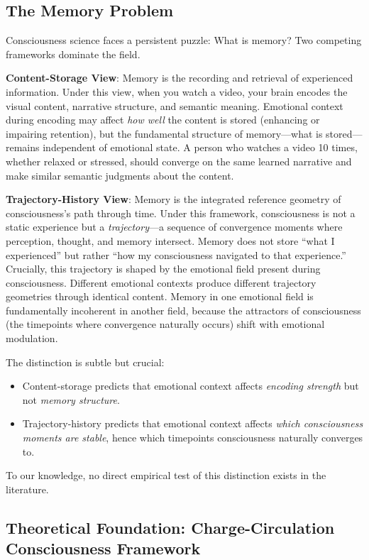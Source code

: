 \documentclass[12pt,a4paper]{article}
\theoremstyle{definition}
\begin{document}
\subsection{The Memory Problem}

Consciousness science faces a persistent puzzle: What is memory? Two competing frameworks dominate the field.

\textbf{Content-Storage View}: Memory is the recording and retrieval of experienced information. Under this view, when you watch a video, your brain encodes the visual content, narrative structure, and semantic meaning. Emotional context during encoding may affect \textit{how well} the content is stored (enhancing or impairing retention), but the fundamental structure of memory---what is stored---remains independent of emotional state. A person who watches a video 10 times, whether relaxed or stressed, should converge on the same learned narrative and make similar semantic judgments about the content.

\textbf{Trajectory-History View}: Memory is the integrated reference geometry of consciousness's path through time. Under this framework, consciousness is not a static experience but a \textit{trajectory}---a sequence of convergence moments where perception, thought, and memory intersect. Memory does not store ``what I experienced'' but rather ``how my consciousness navigated to that experience.'' Crucially, this trajectory is shaped by the emotional field present during consciousness. Different emotional contexts produce different trajectory geometries through identical content. Memory in one emotional field is fundamentally incoherent in another field, because the attractors of consciousness (the timepoints where convergence naturally occurs) shift with emotional modulation.

The distinction is subtle but crucial:
\begin{itemize}
  \item Content-storage predicts that emotional context affects \textit{encoding strength} but not \textit{memory structure}.
  \item Trajectory-history predicts that emotional context affects \textit{which consciousness moments are stable}, hence which timepoints consciousness naturally converges to.
\end{itemize}

To our knowledge, no direct empirical test of this distinction exists in the literature.

\subsection{Theoretical Foundation: Charge-Circulation Consciousness Framework}
\end{document}
